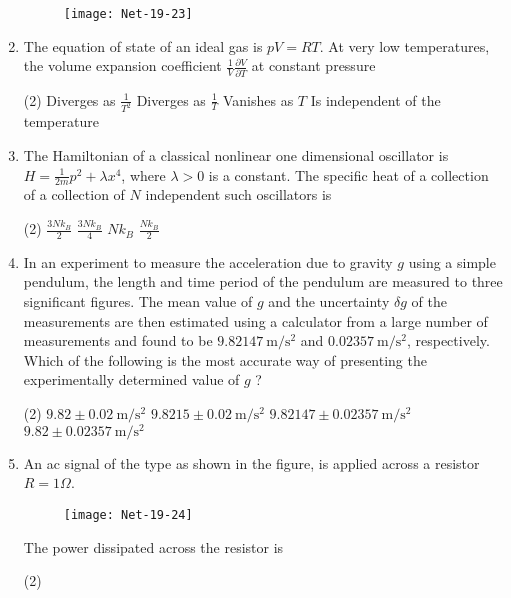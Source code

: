\begin{enumerate}
\begin{tasks}
\begin{figure}[H]
		\centering
		\texttt{[image: Net-19-23]}
	\end{figure}
\end{tasks}
\item  The equation of state of an ideal gas is $p V=R T .$ At very low temperatures, the volume expansion coefficient $\frac{1}{V} \frac{\partial V}{\partial T}$ at constant pressure
 \begin{tasks}(2)
	\task[\textbf{a.}]Diverges as $\frac{1}{T^{2}}$
	\task[\textbf{b.}]Diverges as $\frac{1}{T}$
	\task[\textbf{c.}]Vanishes as $T$
	\task[\textbf{d.}]Is independent of the temperature 
\end{tasks}
\item  The Hamiltonian of a classical nonlinear one dimensional oscillator is $H=\frac{1}{2 m} p^{2}+\lambda x^{4}$, where $\lambda>0$ is a constant. The specific heat of a collection of a collection of $N$ independent such oscillators is
 \begin{tasks}(2)
	\task[\textbf{a.}]$\frac{3 N k_{B}}{2}$
	\task[\textbf{b.}]$\frac{3 N k_{B}}{4}$
	\task[\textbf{c.}]$N k_{B}$
	\task[\textbf{d.}]$\frac{N k_{B}}{2}$ 
\end{tasks}
\item  In an experiment to measure the acceleration due to gravity $g$ using a simple pendulum, the length and time period of the pendulum are measured to three significant figures. The mean value of $g$ and the uncertainty $\delta g$ of the measurements are then estimated using a calculator from a large number of measurements and found to be $9.82147 \mathrm{~m} / \mathrm{s}^{2}$ and $0.02357 \mathrm{~m} / \mathrm{s}^{2}$, respectively. Which of the following is the most accurate way of presenting the experimentally determined value of $g$ ?
 \begin{tasks}(2)
	\task[\textbf{a.}]$9.82 \pm 0.02 \mathrm{~m} / \mathrm{s}^{2}$
	\task[\textbf{b.}]$9.8215 \pm 0.02 \mathrm{~m} / \mathrm{s}^{2}$
	\task[\textbf{c.}]$9.82147 \pm 0.02357 \mathrm{~m} / \mathrm{s}^{2}$
	\task[\textbf{d.}] $9.82 \pm 0.02357 \mathrm{~m} / \mathrm{s}^{2}$ 
\end{tasks}
\item  An ac signal of the type as shown in the figure, is applied across a resistor $R=1 \Omega$.
\begin{figure}[H]
	\centering
	\texttt{[image: Net-19-24]}
\end{figure}
The power dissipated across the resistor is
 \begin{tasks}(2)

\end{tasks}
\end{enumerate}
